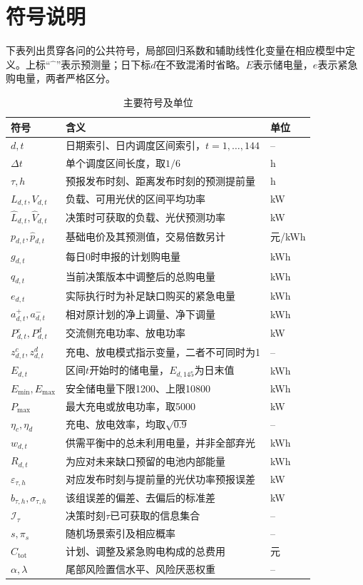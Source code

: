 \documentclass[withoutpreface,bwprint]{cumcmthesis}
\begin{document}
\clearpage
\section{符号说明}
下表列出贯穿各问的公共符号，局部回归系数和辅助线性化变量在相应模型中定义。上标“$\widehat{\phantom{x}}$”表示预测量；日下标$d$在不致混淆时省略。$E$表示储电量，$e$表示紧急购电量，两者严格区分。

\begin{table}[H]
\centering
\caption{主要符号及单位}
\label{tab:global-symbols}
\renewcommand{\arraystretch}{1.12}
\small
\begin{tabularx}{\textwidth}{>{\centering\arraybackslash}p{3.2cm}X>{\centering\arraybackslash}p{2.1cm}}
\toprule
符号 & 含义 & 单位\\
\midrule
$d,t$ & 日期索引、日内调度区间索引，$t=1,\ldots,144$ & --\\
$\Delta t$ & 单个调度区间长度，取$1/6$ & h\\
$\tau,h$ & 预报发布时刻、距离发布时刻的预测提前量 & h\\
$L_{d,t},V_{d,t}$ & 负载、可用光伏的区间平均功率 & kW\\
$\widehat L_{d,t},\widehat V_{d,t}$ & 决策时可获取的负载、光伏预测功率 & kW\\
$p_{d,t},\widehat p_{d,t}$ & 基础电价及其预测值，交易倍数另计 & 元/kWh\\
$g_{d,t}$ & 每日0时申报的计划购电量 & kWh\\
$q_{d,t}$ & 当前决策版本中调整后的总购电量 & kWh\\
$e_{d,t}$ & 实际执行时为补足缺口购买的紧急电量 & kWh\\
$a^+_{d,t},a^-_{d,t}$ & 相对原计划的净上调量、净下调量 & kWh\\
$P^c_{d,t},P^d_{d,t}$ & 交流侧充电功率、放电功率 & kW\\
$z^c_{d,t},z^d_{d,t}$ & 充电、放电模式指示变量，二者不可同时为1 & --\\
$E_{d,t}$ & 区间$t$开始时的储电量，$E_{d,145}$为日末值 & kWh\\
$E_{\min},E_{\max}$ & 安全储电量下限1200、上限10800 & kWh\\
$P_{\max}$ & 最大充电或放电功率，取5000 & kW\\
$\eta_c,\eta_d$ & 充电、放电效率，均取$\sqrt{0.9}$ & --\\
$w_{d,t}$ & 供需平衡中的总未利用电量，并非全部弃光 & kWh\\
$R_{d,t}$ & 为应对未来缺口预留的电池内部能量 & kWh\\
$\varepsilon_{\tau,h}$ & 对应发布时刻与提前量的光伏功率预报误差 & kW\\
$b_{\tau,h},\sigma_{\tau,h}$ & 该组误差的偏差、去偏后的标准差 & kW\\
$\mathcal I_\tau$ & 决策时刻$\tau$已可获取的信息集合 & --\\
$s,\pi_s$ & 随机场景索引及相应概率 & --\\
$C_{\mathrm{tot}}$ & 计划、调整及紧急购电构成的总费用 & 元\\
$\alpha,\lambda$ & 尾部风险置信水平、风险厌恶权重 & --\\
\bottomrule
\end{tabularx}
\end{table}
\end{document}
